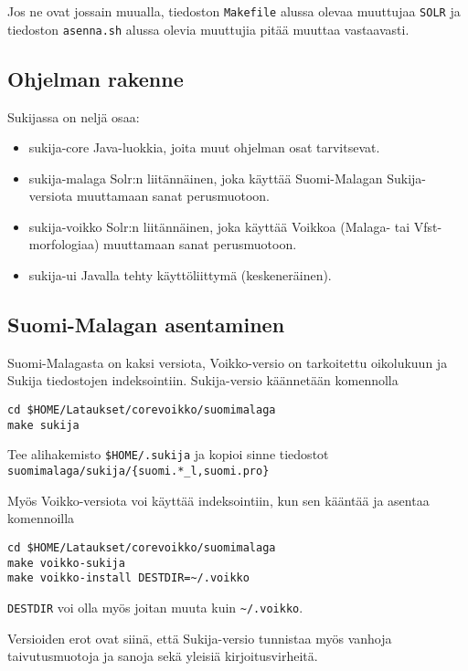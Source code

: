 \documentclass[12pt]{article}
\begin{document}
Jos ne ovat jossain muualla, tiedoston \verb=Makefile= alussa olevaa
muuttujaa \verb=SOLR= ja tiedoston \verb=asenna.sh= alussa olevia
muuttujia pitää muuttaa vastaavasti.


\newpage
\subsection*{Ohjelman rakenne}

Sukijassa on neljä osaa:

\begin{itemize}
\item sukija-core     Java-luokkia, joita muut ohjelman osat tarvitsevat.
\item sukija-malaga   Solr:n liitännäinen, joka käyttää Suomi-Malagan
                      Sukija-versiota muuttamaan sanat perusmuotoon.
\item sukija-voikko   Solr:n liitännäinen, joka käyttää Voikkoa
                      (Malaga- tai Vfst-morfologiaa) muuttamaan sanat perusmuotoon.
\item sukija-ui       Javalla tehty käyttöliittymä (keskeneräinen).
\end{itemize}


\subsection*{Suomi-Malagan asentaminen}

Suomi-Malagasta on kaksi versiota, Voikko-versio on tarkoitettu
oikolukuun ja Sukija tiedostojen indeksointiin. Sukija-versio
käännetään komennolla

\begin{verbatim}
cd $HOME/Lataukset/corevoikko/suomimalaga
make sukija
\end{verbatim}

Tee alihakemisto \verb=$HOME/.sukija= ja kopioi sinne tiedostot
\verb=suomimalaga/sukija/{suomi.*_l,suomi.pro}=

Myös Voikko-versiota voi käyttää indeksointiin, kun sen kääntää ja
asentaa komennoilla

\begin{verbatim}
cd $HOME/Lataukset/corevoikko/suomimalaga
make voikko-sukija
make voikko-install DESTDIR=~/.voikko
\end{verbatim}

\verb|DESTDIR| voi olla myös joitan muuta kuin \verb|~/.voikko|.

Versioiden erot ovat siinä, että Sukija-versio tunnistaa myös vanhoja
taivutusmuotoja ja sanoja sekä yleisiä kirjoitusvirheitä.
\end{document}
